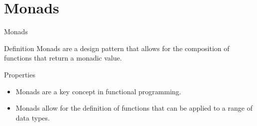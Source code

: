 \section{Monads}
\begin{frame}{Monads}
    \begin{block}{Definition}
        Monads are a design pattern that allows for the composition of functions that return a monadic value.
    \end{block}
    \begin{block}{Properties}
        \begin{itemize}
            \item Monads are a key concept in functional programming.
            \item Monads allow for the definition of functions that can be applied to a range of data types.
        \end{itemize}
    \end{block}
\end{frame}